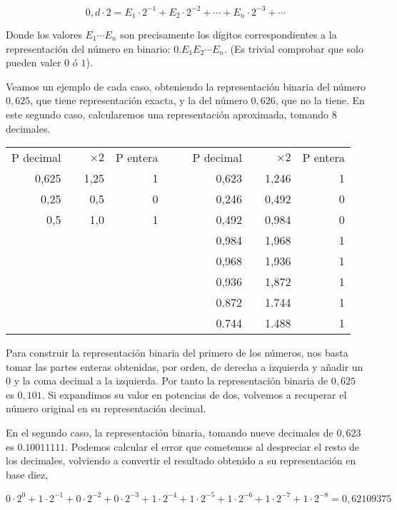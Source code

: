 \begin{equation}
0,d\cdot 2=E_1\cdot 2^{-1}+E_2\cdot 2^{-2}+\cdots+ E_n\cdot 2^{-3}+\cdots
\end{equation} 

Donde los valores $E_1\cdots E_n$ son precisamente los dígitos correspondientes a la representación del número en binario: $0.E_1E_2\cdots E_n$. (Es trivial comprobar que solo pueden valer $0$ ó $1$).


Veamos un ejemplo de cada caso, obteniendo la representación binaria del número $0,625$, que tiene representación exacta, y la del número $0,626$, que no la tiene. En este segundo caso, calcularemos una representación aproximada, tomando 8 decimales.

\begin{table}[h]
\begin{tabular}{|r|r|r|r|r r|r|r|r|r|}
P decimal& &$\times 2$& P entera& &&P decimal& &$\times 2$& P entera\\
\cline{1-4}
\cline{7-10}
0,625& &1,25&1& &&0,623& &1,246&1\\
0,25  & &0,5  &0& &&0,246& &0,492&0\\
0,5    & &1,0  &1& &&0,492& &0,984&0\\
         & &       &  & &&0,984& &1,968&1\\
         & &       &  & &&0,968& &1,936&1\\
         & &       &  & &&0,936& &1,872&1\\
         & &       &  & &&0.872& &1.744&1\\
         & &       &  & &&0.744& &1.488&1\\
\end{tabular}
\end{table}

Para construir la representación binaria del primero de los números, nos basta tomar las partes enteras obtenidas, por orden, de derecha a izquierda y añadir un $0$ y la coma decimal a la izquierda. Por tanto  la representación binaria de $0,625$ es $0,101$.  Si expandimos su valor en potencias de dos, volvemos a recuperar el número original en su representación decimal.

 En el segundo caso, la representación binaria, tomando nueve decimales de $0,623$ es $0.10011111$. Podemos calcular el error que cometemos al despreciar el resto de los decimales, volviendo a convertir el resultado obtenido a su representación en base diez,

 \begin{equation*}
0\cdot 2^{0}+1\cdot 2^{-1}+0\cdot 2^{-2}+ 0\cdot 2^{-3}+1\cdot 2^{-4}+1\cdot 2^{-5}+ 1\cdot 2^{-6}+1\cdot 2^{-7}+1\cdot 2^{-8}=0,62109375
\end{equation*} 

